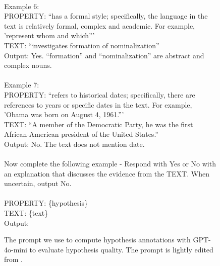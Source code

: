 \begin{figure*}[!htb]
\begin{tcolorbox}[colback=blue!5!white, colframe=blue!75!black, boxrule=0.5mm, arc=4mm, boxsep=5pt, width=\textwidth]
\\
Example 6: \\
PROPERTY: ``has a formal style; specifically, the language in the text is relatively formal, complex and academic. For example, 'represent whom and which''' \\
TEXT: ``investigates formation of nominalization'' \\
Output: Yes. ``formation'' and ``nominalization'' are abstract and complex nouns. \\
\\
Example 7: \\
PROPERTY: ``refers to historical dates; specifically, there are references to years or specific dates in the text. For example, 'Obama was born on August 4, 1961.''' \\
TEXT: ``A member of the Democratic Party, he was the first African-American president of the United States.'' \\
Output: No. The text does not mention date. \\
\\
Now complete the following example - Respond with Yes or No with an explanation that discusses the evidence from the TEXT. When uncertain, output No. \\
\\
PROPERTY: \{hypothesis\} \\
TEXT: \{text\} \\
Output:
\end{tcolorbox}
\caption{The prompt we use to compute hypothesis annotations with GPT-4o-mini to evaluate hypothesis quality. The prompt is lightly edited from \citet{zhong_explaining_2024}.}
\label{fig:concept_annotation_prompt}
\end{figure*}
